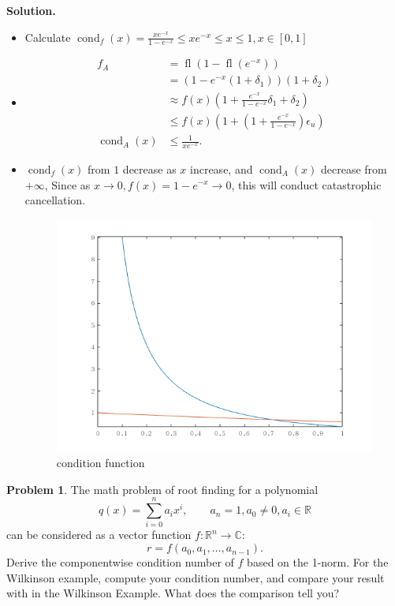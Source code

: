 \documentclass[a4paper]{book}
\newenvironment{solution}%
{\noindent\textbf{Solution.}}%
{\qedhere}
\numberwithin{equation}{chapter}
\theoremstyle{definition}
\newtheorem{pro}[exm]{Problem}
\begin{document}
\begin{solution}
  \begin{itemize}
  \item Calculate $\operatorname{cond}_f(x) = \frac{x e^{-x}}{1 - e^{-x}} \leq x e^{-x} \leq x \leq 1,x \in[0,1]$
    \item \begin{align*}
      f_A &= \operatorname{fl}(1 - \operatorname{fl}(e^{-x})) \\
            &= (1 - e^{-x}( 1 + \delta_1))( 1 + \delta_2) \\
            &\approx f(x)(1 + \frac{e^{-x}}{1 - e^{-x}}\delta_1 + \delta_2)\\
          &\leq f(x)(1 + (1 +\frac{e^{-x}}{1 - e^{-x}})\epsilon_u) \\
      \operatorname{cond}_A(x) &\leq \frac{1}{x e^{-x}}.
    \end{align*}

  \item $\operatorname{cond}_f(x)$ from $1$ decrease as $x$ increase, and $\operatorname{cond}_A(x)$ decrease from $+\infty$, Since as $x \rightarrow 0, f(x) = 1 - e^{-x} \rightarrow 0$, this will conduct catastrophic cancellation. 
    \begin{figure}
      \centering
      \includegraphics*[scale = 1]{code/cond.png}
      \caption{condition function}
    \end{figure}
  \end{itemize}
\end{solution}

\begin{pro}
  The math problem of root finding for a polynomial
  \[ q(x) = \sum\limits_{i = 0}^n a_i x^i, \qquad a_n = 1, a_0 \not= 0, a_i \in \mathbb{R}\]
  can be considered as a vector function $f \colon \mathbb{R}^n \rightarrow \mathbb{C} \colon$
  \[ r = f(a_0, a_1, \ldots, a_{n-1}).\]
  Derive the componentwise condition number of $f$ based on the 1-norm. For the Wilkinson example, compute your condition number, and compare your result with in the Wilkinson Example. What does the comparison tell you?
\end{pro}
\end{document}
